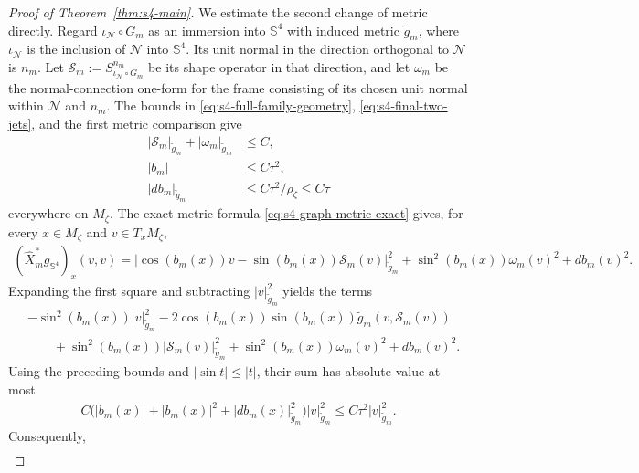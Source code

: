 \documentclass[a4paper,11pt,oneside,reqno]{amsart}
\numberwithin{equation}{section}
\theoremstyle{definition}
\begin{document}
\begin{proof}[Proof of Theorem~\ref{thm:s4-main}]
    We estimate the second change of metric directly.
    Regard $\iota_{\mathcal N}\circ G_m$ as an immersion
    into $\mathbb S^4$ with induced metric $\widetilde g_m$,
    where $\iota_{\mathcal N}$ is the inclusion of
    $\mathcal N$ into $\mathbb S^4$. Its unit normal in
    the direction orthogonal to $\mathcal N$ is $n_m$.
    Let
    $\mathcal S_m:=S_{\iota_{\mathcal N}\circ G_m}^{n_m}$
    be its shape operator in that direction, and let
    $\omega_m$ be the normal-connection one-form for the
    frame consisting of its chosen unit normal within
    $\mathcal N$ and $n_m$.
    The bounds in \eqref{eq:s4-full-family-geometry},
    \eqref{eq:s4-final-two-jets}, and the first metric
    comparison give
    \begin{align*}
        |\mathcal S_m|_{\widetilde g_m}
             +|\omega_m|_{\widetilde g_m}&\leq C,\\
        |b_m|&\leq C\tau^2,\\
        |db_m|_{\widetilde g_m}
             &\leq C\tau^2/\rho_\zeta\leq C\tau
    \end{align*}
    everywhere on $M_\zeta$.
    The exact metric formula
    \eqref{eq:s4-graph-metric-exact} gives, for every
    $x\in M_\zeta$ and $v\in T_xM_\zeta$,
    \begin{align*}
        (\widehat X_m^*g_{\mathbb S^4})_x(v,v)
        =\bigl|\cos(b_m(x))v
                 -\sin(b_m(x))\mathcal S_m(v)
             \bigr|_{\widetilde g_m}^2+\sin^2(b_m(x))\omega_m(v)^2+db_m(v)^2.
    \end{align*}
    Expanding the first square and subtracting
    $|v|_{\widetilde g_m}^2$ yields the terms
    \begin{align*}
        &-\sin^2(b_m(x))|v|_{\widetilde g_m}^2
         -2\cos(b_m(x))\sin(b_m(x))
             \widetilde g_m(v,\mathcal S_m(v))\\
        &\qquad
         +\sin^2(b_m(x))|\mathcal S_m(v)|_{\widetilde g_m}^2
         +\sin^2(b_m(x))\omega_m(v)^2+db_m(v)^2.
    \end{align*}
    Using the preceding bounds and $|\sin t|\leq|t|$,
    their sum has absolute value at most
    \begin{align*}
        C\bigl(|b_m(x)|+|b_m(x)|^2
                  +|db_m(x)|_{\widetilde g_m}^2\bigr)
                  |v|_{\widetilde g_m}^2
        \leq C\tau^2|v|_{\widetilde g_m}^2.
    \end{align*}
    Consequently,
    \begin{align*}

\end{align*}
\end{proof}
\end{document}
